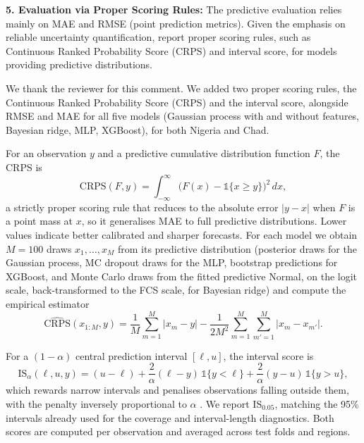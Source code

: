 \begin{reviewercomment}
\textbf{5. Evaluation via Proper Scoring Rules:} The predictive evaluation relies mainly on MAE and RMSE (point prediction metrics). Given the emphasis on reliable uncertainty quantification, report proper scoring rules, such as Continuous Ranked Probability Score (CRPS) and interval score, for models providing predictive distributions.
\end{reviewercomment}
\begin{response}
We thank the reviewer for this comment. We added two proper scoring rules, the Continuous Ranked Probability Score (CRPS) and the interval score, alongside RMSE and MAE for all five models (Gaussian process with and without features, Bayesian ridge, MLP, XGBoost), for both Nigeria and Chad.

For an observation $y$ and a predictive cumulative distribution function $F$, the CRPS is
\begin{equation}
  \mathrm{CRPS}(F, y) = \int_{-\infty}^{\infty} \big(F(x) - \mathbb{1}\{x \ge y\}\big)^2 \, dx,
\end{equation}
a strictly proper scoring rule that reduces to the absolute error $|y - x|$ when $F$ is a point mass at $x$, so it generalises MAE to full predictive distributions. Lower values indicate better calibrated and sharper forecasts. For each model we obtain $M = 100$ draws $x_1, \dots, x_M$ from its predictive distribution (posterior draws for the Gaussian process, MC dropout draws for the MLP, bootstrap predictions for XGBoost, and Monte Carlo draws from the fitted predictive Normal, on the logit scale, back-transformed to the FCS scale, for Bayesian ridge) and compute the empirical estimator
\begin{equation}
  \widehat{\mathrm{CRPS}}(x_{1:M}, y) = \frac{1}{M} \sum_{m=1}^{M} |x_m - y| - \frac{1}{2M^2} \sum_{m=1}^{M} \sum_{m'=1}^{M} |x_m - x_{m'}|.
\end{equation}

For a $(1-\alpha)$ central prediction interval $[\ell, u]$, the interval score is
\begin{equation}
  \mathrm{IS}_\alpha(\ell, u, y) = (u - \ell) + \frac{2}{\alpha}(\ell - y)\,\mathbb{1}\{y < \ell\} + \frac{2}{\alpha}(y - u)\,\mathbb{1}\{y > u\},
\end{equation}
which rewards narrow intervals and penalises observations falling outside them, with the penalty inversely proportional to $\alpha$ \cite{gneiting2007strictly}. We report $\mathrm{IS}_{0.05}$, matching the 95\% intervals already used for the coverage and interval-length diagnostics. Both scores are computed per observation and averaged across test folds and regions.


\end{response}
